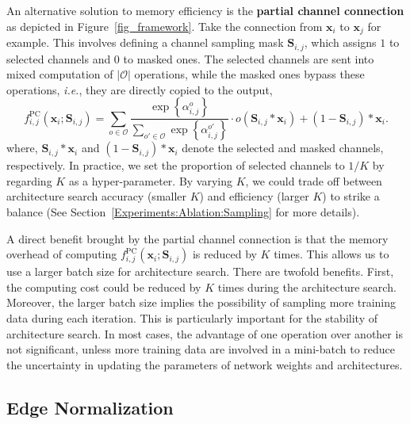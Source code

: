 \documentclass{article} \usepackage{iclr2020_conference,times}
\begin{document}
An alternative solution to memory efficiency is the \textbf{partial channel connection} as depicted in Figure~\ref{fig_framework}. Take the connection from $\mathbf{x}_i$ to $\mathbf{x}_j$ for example. This involves defining a channel sampling mask $\mathbf{S}_{i,j}$, which assigns $1$ to selected channels and $0$ to masked ones. The selected channels are sent into mixed computation of $\left|\mathcal{O}\right|$ operations, while the masked ones bypass these operations, \textit{i.e.}, they are directly copied to the output,
\begin{equation}
\label{eqn:pc}
{f_{i,j}^\mathrm{PC}\!\left(\mathbf{x}_i;\mathbf{S}_{i,j}\right)}={{\sum_{o\in\mathcal{O}}}\frac{\exp\left\{\alpha_{i,j}^o\right\}}{{\sum_{o'\in\mathcal{O}}}\exp\left\{\alpha_{i,j}^{o'}\right\}}\cdot o\!\left(\mathbf{S}_{i,j}\ast\mathbf{x}_i\right)+\left(1-\mathbf{S}_{i,j}\right)\ast\mathbf{x}_i}.
\end{equation}
where, $\mathbf{S}_{i,j}\ast\mathbf{x}_i$ and $\left(1-\mathbf{S}_{i,j}\right)\ast\mathbf{x}_i$ denote the selected and masked channels, respectively. 
In practice, we set the proportion of selected channels to $1/K$ by regarding $K$ as a hyper-parameter. By varying $K$, we could trade off between architecture search accuracy (smaller $K$) and efficiency (larger $K$)  to strike a balance (See Section~\ref{Experiments:Ablation:Sampling} for more details).




A direct benefit brought by the partial channel connection is that the memory overhead of computing $f_{i,j}^\mathrm{PC}\!\left(\mathbf{x}_i;\mathbf{S}_{i,j}\right)$ is reduced by $K$ times. This allows us to use a larger batch size for architecture search. There are twofold benefits. First, the computing cost could be reduced by $K$ times during the architecture search. Moreover, the larger batch size implies the possibility of sampling more training data during each iteration. This is particularly important for the stability of architecture search. In most cases, the advantage of one operation over another is not significant, unless more training data are involved in a mini-batch to reduce the uncertainty in updating the parameters of network weights and architectures. 



\subsection{Edge Normalization}
\label{Approach:EdgeNormalization}
\end{document}
